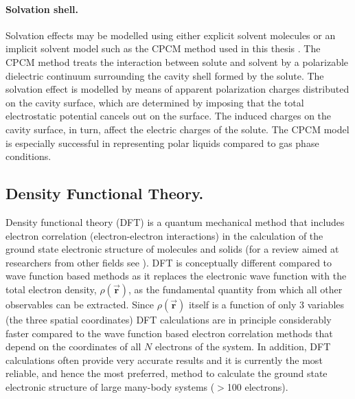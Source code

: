  \paragraph{Solvation shell.} Solvation effects may be modelled using either explicit solvent molecules or an implicit solvent model such as the CPCM method used in this thesis \cite{FrankJensenCC,Barone1998,Klamt1993}. The CPCM method treats the interaction between solute and solvent by a polarizable dielectric continuum surrounding the cavity shell formed by the solute. The solvation effect is modelled by means of apparent polarization charges distributed on the cavity surface, which are determined by imposing that the total electrostatic potential cancels out on the surface. The induced charges on the cavity surface, in turn, affect the electric charges of the solute. The CPCM model is especially successful in representing polar liquids compared to gas phase conditions.

\subsection{Density Functional Theory.}
 Density functional theory (DFT) is a quantum mechanical method that includes electron correlation (electron-electron interactions) in the calculation of the ground state electronic structure of molecules and solids \cite[chapter 6]{FrankJensenCC} (for a review aimed at researchers from other fields see \cite{Capelle2006}). DFT is conceptually different compared to wave function based methods as it replaces the electronic wave function with the total electron density, $\rho(\vec{\textbf{r}})$, as the fundamental quantity from which all other observables can be extracted. Since $\rho(\vec{\textbf{r}})$ itself is a function of only 3 variables (the three spatial coordinates) DFT calculations are in principle considerably faster compared to the wave function based electron correlation methods that depend on the coordinates of all $N$ electrons of the system. In addition, DFT calculations often provide very accurate results and it is currently the most reliable, and hence the most preferred, method to calculate the ground state electronic structure of large many-body systems ($>$100 electrons).

